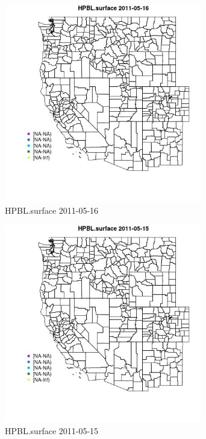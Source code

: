 \begin{figure} 
\centering  
\includegraphics[width=0.77\textwidth]{Code_Outputs/ML_input_report_ML_input_PM25_Step5_part_d_de_duplicated_aves_ML_input_MapObsHPBLsurface2011-05-16.jpg} 
\caption{\label{fig:ML_input_report_ML_input_PM25_Step5_part_d_de_duplicated_aves_ML_inputMapObsHPBLsurface2011-05-16}HPBL.surface 2011-05-16} 
\end{figure} 
 

\begin{figure} 
\centering  
\includegraphics[width=0.77\textwidth]{Code_Outputs/ML_input_report_ML_input_PM25_Step5_part_d_de_duplicated_aves_ML_input_MapObsHPBLsurface2011-05-15.jpg} 
\caption{\label{fig:ML_input_report_ML_input_PM25_Step5_part_d_de_duplicated_aves_ML_inputMapObsHPBLsurface2011-05-15}HPBL.surface 2011-05-15} 
\end{figure} 
 

